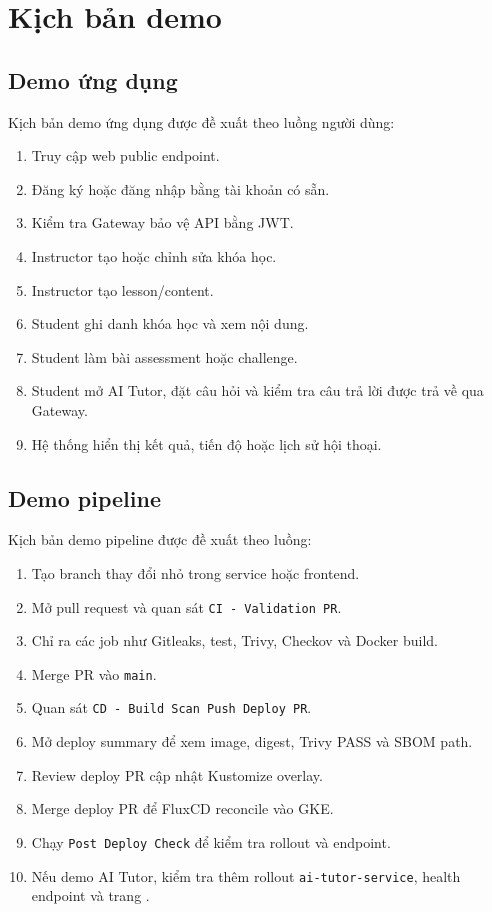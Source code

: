 \chapter{Kịch bản demo}
\label{appendix:demo-script}

\section{Demo ứng dụng}

Kịch bản demo ứng dụng được đề xuất theo luồng người dùng:

\begin{enumerate}
  \item Truy cập web public endpoint.
  \item Đăng ký hoặc đăng nhập bằng tài khoản có sẵn.
  \item Kiểm tra Gateway bảo vệ API bằng JWT.
  \item Instructor tạo hoặc chỉnh sửa khóa học.
  \item Instructor tạo lesson/content.
  \item Student ghi danh khóa học và xem nội dung.
  \item Student làm bài assessment hoặc challenge.
  \item Student mở AI Tutor, đặt câu hỏi và kiểm tra câu trả lời được trả về qua Gateway.
  \item Hệ thống hiển thị kết quả, tiến độ hoặc lịch sử hội thoại.
\end{enumerate}


\section{Demo pipeline}

Kịch bản demo pipeline được đề xuất theo luồng:

\begin{enumerate}
  \item Tạo branch thay đổi nhỏ trong service hoặc frontend.
  \item Mở pull request và quan sát \texttt{CI - Validation PR}.
  \item Chỉ ra các job như Gitleaks, test, Trivy, Checkov và Docker build.
  \item Merge PR vào \texttt{main}.
  \item Quan sát \texttt{CD - Build Scan Push Deploy PR}.
  \item Mở deploy summary để xem image, digest, Trivy PASS và SBOM path.
  \item Review deploy PR cập nhật Kustomize overlay.
  \item Merge deploy PR để FluxCD reconcile vào GKE.
  \item Chạy \texttt{Post Deploy Check} để kiểm tra rollout và endpoint.
  \item Nếu demo AI Tutor, kiểm tra thêm rollout \texttt{ai-tutor-service}, health endpoint  và trang .
\end{enumerate}

